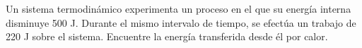 \item Un sistema termodinámico experimenta un proceso en el que su energía interna disminuye 500 J. Durante el mismo intervalo de tiempo, se efectúa un trabajo de 220 J sobre el sistema. Encuentre la energía transferida desde él por calor.
